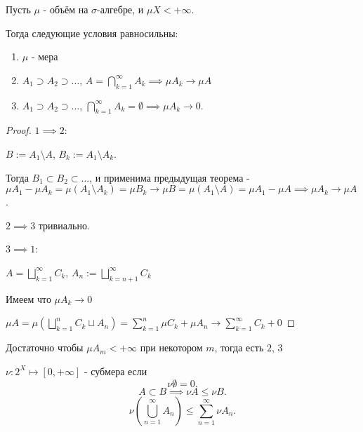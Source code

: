 \begin{theorem} \thmslashn

    Пусть $\mu$ - объём на $\sigma$-алгебре, и $\mu X < +\infty$.

    Тогда следующие условия равносильны:
    \begin{enumerate}
        \item $\mu$ - мера
        \item $A_1 \supset A_2 \supset \ldots$, $A = \bigcap\limits_{k=1}^{\infty} A_{k} \implies \mu A_{k} \to \mu A $
        \item $A_1 \supset A_2 \supset \ldots$, $\bigcap\limits_{k=1}^{\infty} A_{k} = \emptyset \implies \mu A_{k} \to 0 $.
    \end{enumerate}
    \begin{proof} \thmslashn
    
        $1 \implies 2$:

        $B := A_1 \setminus A$, $B_{k} := A_1 \setminus A_{k}$.

        Тогда $B_1 \subset B_2 \subset \ldots$, и применима предыдущая теорема - $\mu A_1 - \mu A_{k} = \mu(A_1 \setminus A_{k}) = \mu B_{k} \to \mu B = \mu( A_1 \setminus A) = \mu A_1 - \mu A \implies \mu A_{k} \to  \mu A$.

        $2 \implies 3$ тривиально.

        $3 \implies 1$:

        $A = \bigsqcup\limits_{k=1}^{\infty} C_{k}$, $A_{n} := \bigsqcup\limits_{k=n+1}^{\infty} C_{k} $ 

        Имеем что $\mu A_{k} \to 0$

        $\mu A = \mu \left( \bigsqcup\limits_{k=1}^{n} C_{k} \sqcup A_{n} \right) = \sum\limits_{k=1}^{n} \mu C_{k} + \mu A_{n} \to \sum\limits_{k=1}^{\infty} C_{k} + 0 $
    \end{proof}
\end{theorem}
\begin{consequence} \thmslashn

    Достаточно чтобы $\mu A_{m} < +\infty$ при некотором $m$, тогда есть $2$, $3$
\end{consequence}
\begin{definition} \thmslashn 

    $\nu : 2^{X} \mapsto [0, +\infty]$ - субмера если
    \[ \nu \emptyset = 0 .\]
    \[ A \subset B \implies \nu A \le \nu B .\]
    \[ \nu\left( \bigcup_{n=1}^{\infty} A_{n}  \right) \le \sum\limits_{n=1}^{\infty} \nu A_{n}  .\] 
\end{definition}
